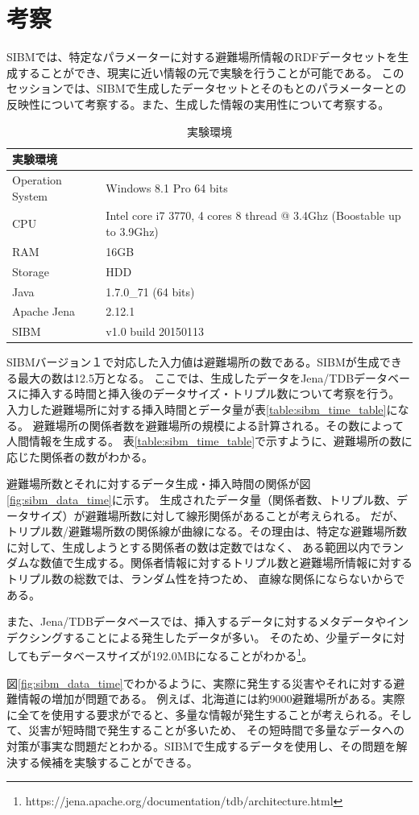 \section{考察}

SIBMでは、特定なパラメーターに対する避難場所情報のRDFデータセットを生成することができ、現実に近い情報の元で実験を行うことが可能である。
このセッションでは、SIBMで生成したデータセットとそのもとのパラメーターとの反映性について考察する。また、生成した情報の実用性について考察する。

\begin{table}[h]
	\begin{center}
	\begin{tabular}{| l  p{45mm} |}
		\hline
		\rowstyle{\bfseries}
		実験環境 & \\
		\hline
		Operation System & Windows 8.1 Pro 64 bits \\
		CPU & Intel core i7 3770, 4 cores 8 thread @ 3.4Ghz (Boostable up to 3.9Ghz)
		\\
		RAM & 16GB \\
		Storage & HDD \\
		Java & 1.7.0\_71 (64 bits) \\
		Apache Jena & 2.12.1 \\
		SIBM & v1.0 build 20150113 \\
		\hline
	\end{tabular}
	\caption{実験環境}
	\label{table:sibm_env}
	\end{center}
\end{table}

SIBMバージョン１で対応した入力値は避難場所の数である。SIBMが生成できる最大の数は12.5万となる。
ここでは、生成したデータをJena/TDBデータベースに挿入する時間と挿入後のデータサイズ・トリプル数について考察を行う。
入力した避難場所に対する挿入時間とデータ量が表\ref{table:sibm_time_table}になる。
避難場所の関係者数を避難場所の規模による計算される。その数によって人間情報を生成する。
表\ref{table:sibm_time_table}で示すように、避難場所の数に応じた関係者の数がわかる。

避難場所数とそれに対するデータ生成・挿入時間の関係が図\ref{fig:sibm_data_time}に示す。
生成されたデータ量（関係者数、トリプル数、データサイズ）が避難場所数に対して線形関係があることが考えられる。
だが、トリプル数/避難場所数の関係線が曲線になる。その理由は、特定な避難場所数に対して、生成しようとする関係者の数は定数ではなく、
ある範囲以内でランダムな数値で生成する。関係者情報に対するトリプル数と避難場所情報に対するトリプル数の総数では、ランダム性を持つため、
直線な関係にならないからである。

また、Jena/TDBデータベースでは、挿入するデータに対するメタデータやインデクシングすることによる発生したデータが多い。
そのため、少量データに対してもデータベースサイズが192.0MBになることがわかる\footnote{https://jena.apache.org/documentation/tdb/architecture.html}。

図\ref{fig:sibm_data_time}でわかるように、実際に発生する災害やそれに対する避難情報の増加が問題である。
例えば、北海道には約9000避難場所がある。実際に全てを使用する要求がでると、多量な情報が発生することが考えられる。そして、災害が短時間で発生することが多いため、
その短時間で多量なデータへの対策が事実な問題だとわかる。SIBMで生成するデータを使用し、その問題を解決する候補を実験することができる。
